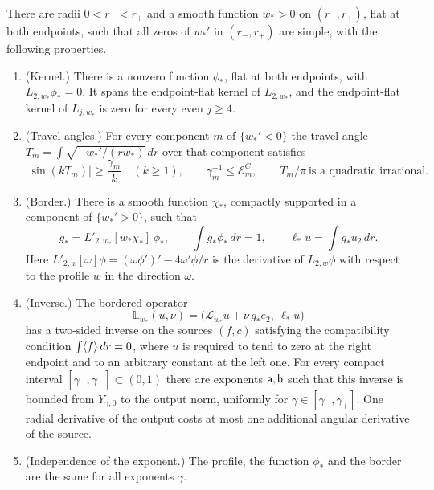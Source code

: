 \begin{proposition}\label{prop:rad-fixed-theorem}
There are radii $0<r_-<r_+$ and a smooth function $w_*>0$ on
$(r_-,r_+)$, flat at both endpoints, such that all zeros of $w_*'$ in
$(r_-,r_+)$ are simple, with the following properties.
\begin{enumerate}
\item \textup{(Kernel.)} There is a nonzero function $\phi_*$, flat at
 both endpoints, with $L_{2,w_*}\phi_*=0$. It spans the endpoint-flat
 kernel of $L_{2,w_*}$, and the endpoint-flat kernel of $L_{j,w_*}$ is
 zero for every even $j\ge4$.
\item \textup{(Travel angles.)} For every component $m$ of
 $\{w_*'<0\}$ the travel angle
 $T_m=\int\sqrt{-w_*'/(rw_*)}\,dr$ over that component satisfies
 \begin{equation}\label{eq:rad-eq-optical-margin}
  |\sin(kT_m)|\ge\frac{\gamma_m}{k}\quad(k\ge1),
  \qquad \gamma_m^{-1}\le\mathcal E_m^{C},
  \qquad T_m/\pi\ \text{is a quadratic irrational}.
 \end{equation}
\item \textup{(Border.)} There is a smooth function $\chi_*$,
 compactly supported in a component of $\{w_*'>0\}$, such that
 \begin{equation}\label{eq:rad-eq-target-border}
  g_*=L'_{2,w_*}[w_*\chi_*]\,\phi_*,\qquad
  \int g_*\phi_*\,dr=1,\qquad
  \ell_*u=\int g_*u_2\,dr .
 \end{equation}
 Here $L'_{2,w}[\omega]\phi=(\omega\phi')'-4\omega'\phi/r$ is the
 derivative of $L_{2,w}\phi$ with respect to the profile $w$ in the
 direction $\omega$.
\item \textup{(Inverse.)} The bordered operator
 \begin{equation}\label{eq:rad-eq-bordered-reference}
  \mathbb L_{w_*}(u,\nu)
    =\bigl(\mathscr L_{w_*}u+\nu\,g_*e_2,\ \ell_*u\bigr)
 \end{equation}
 has a two-sided inverse on the sources $(f,c)$ satisfying the
 compatibility condition $\int\langle f\rangle\,dr=0$, where $u$ is required to
 tend to zero at the right endpoint and to an arbitrary constant at
 the left one. For every compact interval
 $[\gamma_-,\gamma_+]\subset(0,1)$ there are exponents $\mathsf a,\mathsf b$ such
 that this inverse is bounded from $Y_{\gamma,0}$ to the output norm,
 uniformly for $\gamma\in[\gamma_-,\gamma_+]$. One radial derivative
 of the output costs at most one additional angular derivative of the
 source.
\item \textup{(Independence of the exponent.)} The profile, the
 function $\phi_*$ and the border are the same for all exponents
 $\gamma$.
\end{enumerate}
\end{proposition}

